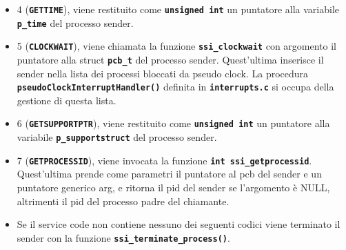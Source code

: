 \documentclass{article}
\begin{document}
\begin{itemize}
    \item 4 (\texttt{\textbf{GETTIME}}), viene restituito come \texttt{\textbf{unsigned int}} un puntatore alla variabile \texttt{\textbf{p\_time}} del processo sender.
	
    \item 5 (\texttt{\textbf{CLOCKWAIT}}), viene chiamata la funzione \texttt{\textbf{ssi\_clockwait}} con argomento il puntatore alla struct \texttt{\textbf{pcb\_t}} del processo sender.
    Quest'ultima inserisce il sender nella lista dei processi bloccati da pseudo clock.
    La procedura \texttt{\textbf{pseudoClockInterruptHandler()}} definita in \texttt{\textbf{interrupts.c}} si occupa della gestione di questa lista.

    \item 6 (\texttt{\textbf{GETSUPPORTPTR}}), viene restituito come \texttt{\textbf{unsigned int}} un puntatore alla variabile \texttt{\textbf{p\_supportstruct}} del processo sender.

    \item 7 (\texttt{\textbf{GETPROCESSID}}), viene invocata la funzione \texttt{\textbf{int ssi\_getprocessid}}. Quest'ultima prende come parametri il puntatore al pcb del sender e un puntatore generico arg, e ritorna il pid del sender se l'argomento è NULL, altrimenti il pid del processo padre del chiamante.

    \item Se il service code non contiene nessuno dei seguenti codici viene terminato il sender con la funzione \texttt{\textbf{ssi\_terminate\_process()}}.
\end{itemize} 
\end{document}
